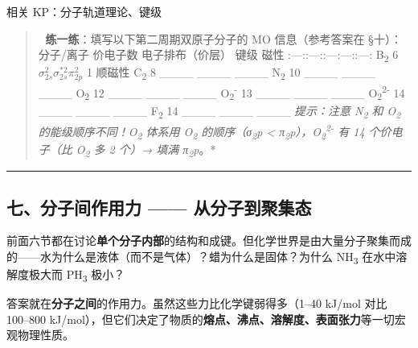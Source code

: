 \documentclass[a4paper,11pt]{ctexart}
\begin{document}
相关 KP：分子轨道理论、键级

\begin{quote}
📝 \textbf{练一练}：填写以下第二周期双原子分子的 MO 信息（参考答案在 §十）：
\textbar{} 分子/离子 \textbar{} 价电子数 \textbar{} 电子排布（价层） \textbar{} 键级 \textbar{} 磁性 \textbar{}
\textbar:---:\textbar:---:\textbar:---\textbar:---:\textbar:---:\textbar{}
\textbar{} B\textsubscript{2} \textbar{} 6 \textbar{} \(\sigma_{2s}^2 \sigma_{2s}^{*2} \pi_{2p}^2\) \textbar{} 1 \textbar{} 顺磁性 \textbar{}
\textbar{} C\textsubscript{2} \textbar{} 8 \textbar{} \_\_\_\_ \textbar{} \_\_\_\_ \textbar{} \_\_\_\_ \textbar{}
\textbar{} N\textsubscript{2} \textbar{} 10 \textbar{} \_\_\_\_ \textbar{} \_\_\_\_ \textbar{} \_\_\_\_ \textbar{}
\textbar{} O\textsubscript{2} \textbar{} 12 \textbar{} \_\_\_\_ \textbar{} \_\_\_\_ \textbar{} \_\_\_\_ \textbar{}
\textbar{} O\textsubscript{2}\textsuperscript{-} \textbar{} 13 \textbar{} \_\_\_\_ \textbar{} \_\_\_\_ \textbar{} \_\_\_\_ \textbar{}
\textbar{} O\textsubscript{2}\textsuperscript{2-} \textbar{} 14 \textbar{} \_\_\_\_ \textbar{} \_\_\_\_ \textbar{} \_\_\_\_ \textbar{}
\textbar{} F\textsubscript{2} \textbar{} 14 \textbar{} \_\_\_\_ \textbar{} \_\_\_\_ \textbar{} \_\_\_\_ \textbar{}
\emph{提示：注意 N\textsubscript{2} 和 O\textsubscript{2} 的能级顺序不同！O\textsubscript{2} 体系用 O\textsubscript{2} 的顺序（σ\textsubscript{2}p \textless{} π\textsubscript{2}p），O\textsubscript{2}\textsuperscript{2-} 有 14 个价电子（比 O\textsubscript{2} 多 2 个）→ 填满 π\textsubscript{2}p}。*
\end{quote}

\begin{center}\rule{0.5\linewidth}{0.5pt}\end{center}

\subsection{七、分子间作用力 ------ 从分子到聚集态}\label{ux4e03ux5206ux5b50ux95f4ux4f5cux7528ux529b-ux4eceux5206ux5b50ux5230ux805aux96c6ux6001}

前面六节都在讨论\textbf{单个分子内部}的结构和成键。但化学世界是由大量分子聚集而成的------水为什么是液体（而不是气体）？蜡为什么是固体？为什么 NH\textsubscript{3} 在水中溶解度极大而 PH\textsubscript{3} 极小？

答案就在\textbf{分子之间}的作用力。虽然这些力比化学键弱得多（1--40 kJ/mol 对比 100--800 kJ/mol），但它们决定了物质的\textbf{熔点、沸点、溶解度、表面张力}等一切宏观物理性质。
\end{document}
